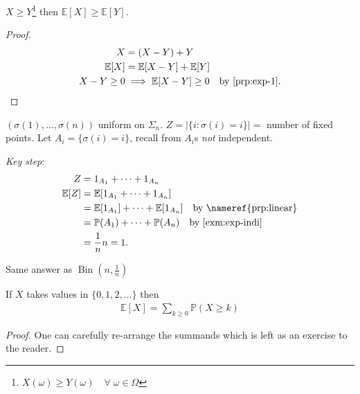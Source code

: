 \begin{corollary}
    $X \geq Y$\footnote{$X(\omega) \geq Y(\omega) \quad \forall \; \omega \in \Omega$} then $\mathbb{E}[X] \geq \mathbb{E}[Y]$.
\end{corollary} 

\begin{proof}
    \begin{align*}
        X &= (X - Y) + Y \\
        \mathbb{E}[X] &= \mathbb{E}[X - Y] + \mathbb{E}[Y] \\
        X - Y \geq 0 &\implies \mathbb{E}[X - Y] \geq 0 \quad \text{by \Cref{prp:exp-1}}.
    \end{align*} 
\end{proof} 

\begin{example}
    $(\sigma(1), \dots, \sigma(n))$ uniform on $\Sigma_n$.
    $Z = |\{i : \sigma(i) = i\}| =$ number of fixed points.
    Let $A_i = \{\sigma(i) = i\}$, \color{blue} recall from  $A_i$s \emph{not} independent. \color{black}

    \emph{Key step}:
    \begin{align*}
        Z &= 1_{A_1} + \dots + 1_{A_n} \\
        \mathbb{E}[Z] &= \mathbb{E}[1_{A_1} + \dots + 1_{A_n}] \\
        &= \mathbb{E}[1_{A_1}] + \dots + \mathbb{E}[1_{A_n}] \quad \text{by \nameref{prp:linear}} \\
        &= \mathbb{P}(A_1) + \dots + \mathbb{P}(A_n) \quad \text{by \Cref{exm:exp-indi}}\\
        &= \frac{1}{n} n = 1.
    \end{align*}
\end{example}

\begin{note}
    Same answer as $\operatorname{Bin}(n, \frac{1}{n})$
\end{note} 

\begin{proposition}
    If $X$ takes values in $\{0, 1, 2, \dots\}$ then
    \begin{align*}
        \mathbb{E}[X] = \sum_{k \geq 0} \mathbb{P}(X \geq k)
    \end{align*} 
\end{proposition} 

\begin{proof}
    One can carefully re-arrange the summands which is left as an exercise to the reader.
\end{proof} 

